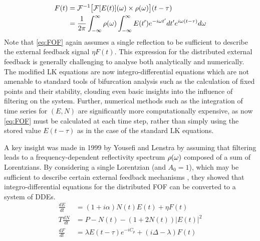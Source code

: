 %
\begin{equation}
    \begin{aligned}
    \label{eq:FOF}
         F(t) &=  \mathcal{F}^{-1}\big[ \mathcal{F}[E(t)](\omega) \times \rho(\omega) \big](t-\tau)\\
              &= \frac{1}{2\pi} \int_{-\infty}^{\infty} \rho(\omega) \int_{-\infty}^{\infty} E(t') e^{-i \omega t'} dt' e^{i \omega (t-\tau)} d\omega
    \end{aligned}
\end{equation}
%
Note that \eqref{eq:FOF} again assumes a single reflection to be sufficient to describe the external feedback signal $\eta F(t)$. This expression for the distributed external feedback is generally challenging to analyse both analytically and numerically. The modified LK equations are now integro-differential equations which are not amenable to standard tools of bifurcation analysis such as the calculation of fixed points and their stability, clouding even basic insights into the influence of filtering on the system. Further, numerical methods such as the integration of time series for $(E,N)$ are significantly more computationally expensive, as now \eqref{eq:FOF} must be calculated at each time step, rather than simply using the stored value $E(t-\tau)$ as in the case of the standard LK equations.
%
\par
%
A key insight was made in 1999 by Yousefi and Lenstra \cite{yousefi1999dynamical} by assuming that filtering leads to a frequency-dependent reflectivity spectrum $\rho(\omega)$ composed of a sum of Lorentzians. By considering a single Lorentzian (and $A_0=1$), which may be sufficient to describe certain external feedback mechanisms \cite{dahmani1987frequency,detienne1997semiconductor}, they showed that integro-differential equations for the distributed FOF can be converted to a system of DDEs.
%
\begin{equation}
    \begin{aligned}
    \label{eq:FOF_LK}
        \frac{d E}{d t} &= (1+i \alpha) N(t) E(t)+\eta F(t) \\
        T \frac{d N}{d t} &= P - N(t) - (1 + 2 N(t))|E(t)|^2 \\
        \frac{d F}{d t} &= \lambda E(t-\tau) e^{-i C_p}+(i \Delta-\lambda) F(t)
    \end{aligned}
\end{equation}
%
